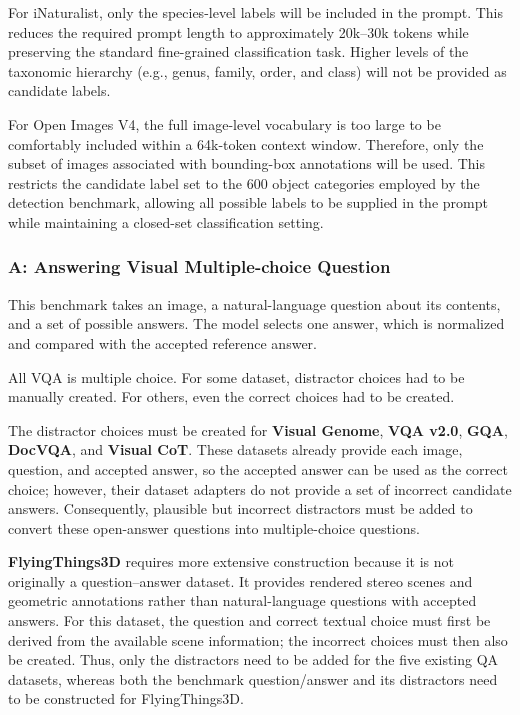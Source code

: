 ﻿\documentclass[11pt,a4paper]{article}
\begin{document}
For iNaturalist, only the species-level labels will be included in the prompt. This reduces the required prompt length to approximately 20k--30k tokens while preserving the standard fine-grained classification task. Higher levels of the taxonomic hierarchy (e.g., genus, family, order, and class) will not be provided as candidate labels.

For Open Images V4, the full image-level vocabulary is too large to be comfortably included within a 64k-token context window. Therefore, only the subset of images associated with bounding-box annotations will be used. This restricts the candidate label set to the 600 object categories employed by the detection benchmark, allowing all possible labels to be supplied in the prompt while maintaining a closed-set classification setting.

\subsubsection{\textbf{A:} Answering Visual Multiple-choice Question}

This benchmark takes an image, a natural-language question about its contents, and a set of possible answers. The model selects one answer, which is normalized and compared with the accepted reference answer.

All VQA is multiple choice. For some dataset, distractor choices had to be manually created. For others, even the correct choices had to be created.

The distractor choices must be created for \textbf{Visual Genome}, \textbf{VQA v2.0}, \textbf{GQA}, \textbf{DocVQA}, and \textbf{Visual CoT}. These datasets already provide each image, question, and accepted answer, so the accepted answer can be used as the correct choice; however, their dataset adapters do not provide a set of incorrect candidate answers. Consequently, plausible but incorrect distractors must be added to convert these open-answer questions into multiple-choice questions.

\textbf{FlyingThings3D} requires more extensive construction because it is not originally a question--answer dataset. It provides rendered stereo scenes and geometric annotations rather than natural-language questions with accepted answers. For this dataset, the question and correct textual choice must first be derived from the available scene information; the incorrect choices must then also be created. Thus, only the distractors need to be added for the five existing QA datasets, whereas both the benchmark question/answer and its distractors need to be constructed for FlyingThings3D.
\end{document}
